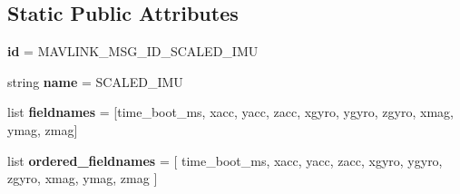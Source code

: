 \subsection*{Static Public Attributes}
\begin{DoxyCompactItemize}
\item 
\mbox{\label{classpymavlink_1_1dialects_1_1v10_1_1MAVLink__scaled__imu__message_a1ac2340d4de03bf5ef3d49c3ea036dde}} 
{\bfseries id} = M\+A\+V\+L\+I\+N\+K\+\_\+\+M\+S\+G\+\_\+\+I\+D\+\_\+\+S\+C\+A\+L\+E\+D\+\_\+\+I\+MU
\item 
\mbox{\label{classpymavlink_1_1dialects_1_1v10_1_1MAVLink__scaled__imu__message_a16af71655403ef06f543f209efa83f8e}} 
string {\bfseries name} = \textquotesingle{}S\+C\+A\+L\+E\+D\+\_\+\+I\+MU\textquotesingle{}
\item 
\mbox{\label{classpymavlink_1_1dialects_1_1v10_1_1MAVLink__scaled__imu__message_a2770a59d3fc4ba70921bfc063ed8ce69}} 
list {\bfseries fieldnames} = \mbox{[}\textquotesingle{}time\+\_\+boot\+\_\+ms\textquotesingle{}, \textquotesingle{}xacc\textquotesingle{}, \textquotesingle{}yacc\textquotesingle{}, \textquotesingle{}zacc\textquotesingle{}, \textquotesingle{}xgyro\textquotesingle{}, \textquotesingle{}ygyro\textquotesingle{}, \textquotesingle{}zgyro\textquotesingle{}, \textquotesingle{}xmag\textquotesingle{}, \textquotesingle{}ymag\textquotesingle{}, \textquotesingle{}zmag\textquotesingle{}\mbox{]}
\item 
\mbox{\label{classpymavlink_1_1dialects_1_1v10_1_1MAVLink__scaled__imu__message_a2a188e84a06b71b8f3be0edbc0000c10}} 
list {\bfseries ordered\+\_\+fieldnames} = \mbox{[} \textquotesingle{}time\+\_\+boot\+\_\+ms\textquotesingle{}, \textquotesingle{}xacc\textquotesingle{}, \textquotesingle{}yacc\textquotesingle{}, \textquotesingle{}zacc\textquotesingle{}, \textquotesingle{}xgyro\textquotesingle{}, \textquotesingle{}ygyro\textquotesingle{}, \textquotesingle{}zgyro\textquotesingle{}, \textquotesingle{}xmag\textquotesingle{}, \textquotesingle{}ymag\textquotesingle{}, \textquotesingle{}zmag\textquotesingle{} \mbox{]}
\item 

\end{DoxyCompactItemize}
